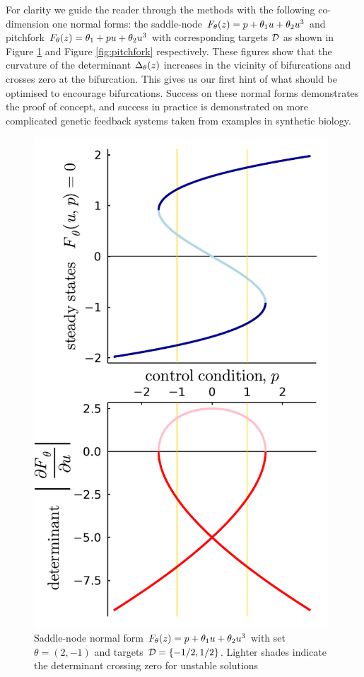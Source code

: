 For clarity we guide the reader through the methods with the following co-dimension one normal forms: the saddle-node $F_{\theta}(z) = p + \theta_{1}u+\theta_{2}u^3$ and pitchfork $F_{\theta}(z) = \theta_{1} + p u+\theta_{2}u^3$ with corresponding targets $\mathcal{D}$ as shown in Figure \ref{fig:saddle-node} and Figure \ref{fig:pitchfork} respectively. These figures show that the curvature of the determinant $\Delta_{\theta}(z)$ increases in the vicinity of bifurcations and crosses zero at the bifurcation. This gives us our first hint of what should be optimised to encourage bifurcations. Success on these normal forms demonstrates the proof of concept, and success in practice is demonstrated on more complicated genetic feedback systems taken from examples in synthetic biology.
\begin{figure}[H]
\centering{}
\captionsetup{justification=centering}
\includegraphics[width=11cm]{docs/figures/saddle-node}
\caption{Saddle-node normal form $F_{\theta}(z) = p + \theta_{1}u+\theta_{2}u^3$ with set $\theta=(2,-1)$ and targets $\mathcal{D}=\{-1/2,1/2\}$. Lighter shades indicate the determinant crossing zero for unstable solutions}
\label{fig:saddle-node}
\end{figure}
